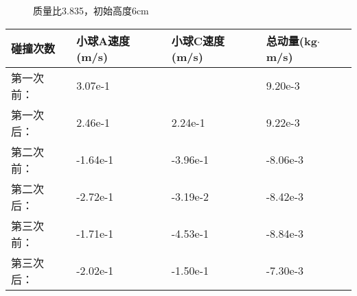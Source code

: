 \documentclass[UTF8]{article}
\begin{document}
\begin{enumerate}
\begin{enumerate}[left=2em, label=\arabic*)]
\begin{figure}[H]
\begin{subfigure}{0.45\textwidth}
                                \end{subfigure}
                                \caption{质量比3.835，初始高度6cm}
                                \label{fig:3.835-6}
                            \end{figure}
                            \vfill
                            \begin{table}[H]
                                \centering
                                \begin{tabularx}{\textwidth}{
                                    || >{\centering\arraybackslash}X
                                    | >{\centering\arraybackslash}X
                                    | >{\centering\arraybackslash}X
                                    | >{\centering\arraybackslash}X
                                    ||
                                }
                                    \hline
                                    碰撞次数 & 小球A速度(m/s) & 小球C速度(m/s) & 总动量(kg$\cdot$m/s)\\ \hline
                                    第一次前： & 3.07e-1 & 0 & 9.20e-3 \\ \hline
                                    第一次后： & 2.46e-1 & 2.24e-1 & 9.22e-3 \\ \hline
                                    第二次前： & -1.64e-1 & -3.96e-1 & -8.06e-3\\ \hline
                                    第二次后： & -2.72e-1 & -3.19e-2 & -8.42e-3 \\ \hline
                                    第三次前： & -1.71e-1 & -4.53e-1 & -8.84e-3 \\ \hline
                                    第三次后： & -2.02e-1 & -1.50e-1 & -7.30e-3\\ \hline
                                    

\end{tabularx}
\end{table}
\end{enumerate}
\end{enumerate}
\end{document}
